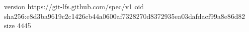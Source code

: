 version https://git-lfs.github.com/spec/v1
oid sha256:e8d3ba9619c2c1426cb44a0600af7328270d8372935ea03dafdacf99a8e86d82
size 4445
